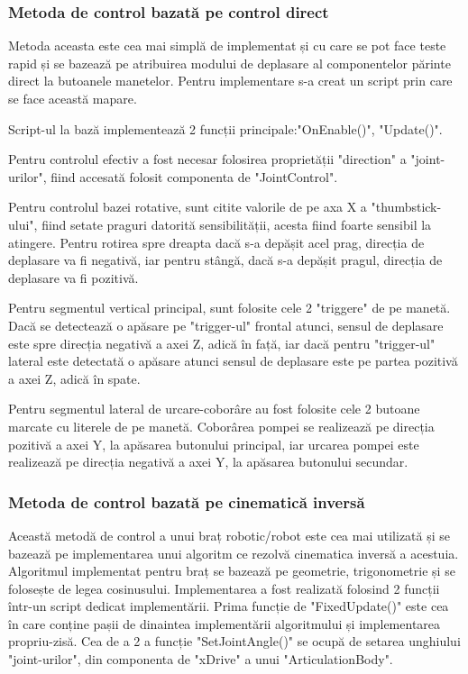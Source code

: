 \subsubsection{Metoda de control bazată pe control direct}
Metoda aceasta este cea mai simplă de implementat și cu  care se pot face teste rapid și se bazează pe atribuirea modului de deplasare al componentelor părinte direct la butoanele manetelor. Pentru implementare s-a creat un script prin care se face această mapare.

Script-ul la bază implementează 2 funcții principale:"OnEnable()",  "Update()". 

Pentru controlul efectiv a fost necesar folosirea proprietății "direction" a "joint-urilor", fiind accesată folosit componenta de "JointControl".

Pentru controlul bazei rotative, sunt citite valorile de pe axa X a "thumbstick-ului", fiind setate praguri datorită sensibilității, acesta fiind foarte sensibil la atingere. Pentru rotirea spre dreapta dacă s-a depășit acel prag, direcția de deplasare va fi negativă, iar pentru stângă,  dacă s-a depășit pragul, direcția de deplasare va fi pozitivă.


Pentru segmentul vertical principal, sunt folosite cele 2 "triggere" de pe manetă. Dacă se detectează o apăsare pe "trigger-ul" frontal atunci, sensul de deplasare este spre direcția negativă a axei Z, adică în  față, iar dacă pentru "trigger-ul" lateral este detectată o apăsare atunci sensul de deplasare este pe partea pozitivă a axei Z, adică în spate.

Pentru segmentul lateral de  urcare-coborâre au fost folosite cele 2 butoane marcate cu literele de pe manetă. Coborârea pompei se realizează pe direcția pozitivă a axei Y, la apăsarea butonului principal, iar urcarea pompei este realizează pe direcția negativă a axei Y, la apăsarea butonului secundar.


\subsubsection{Metoda de control bazată pe cinematică inversă}
Această metodă de control a unui braț robotic/robot este cea mai utilizată și se bazează pe implementarea unui algoritm ce rezolvă cinematica inversă a acestuia. Algoritmul implementat pentru braț se bazează pe geometrie, trigonometrie și se folosește de legea cosinusului. Implementarea a fost realizată folosind 2 funcții într-un script dedicat implementării. Prima funcție de "FixedUpdate()" este cea în care conține pașii de dinaintea implementării algoritmului și implementarea propriu-zisă. Cea de a 2 a funcție "SetJointAngle()" se ocupă de setarea unghiului "joint-urilor", din componenta de "xDrive" a unui "ArticulationBody".

